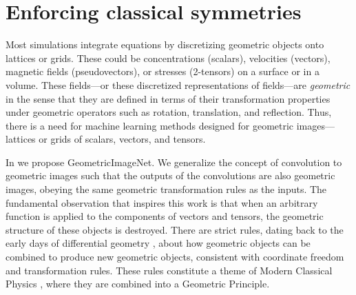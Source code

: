 \documentclass[10pt]{article}
\begin{document}
\section{Enforcing classical symmetries}

Most simulations integrate equations by discretizing geometric objects onto lattices or grids.
These could be concentrations (scalars), velocities (vectors), magnetic fields (pseudovectors), or stresses (2-tensors) on a surface or in a volume.
These fields---or these discretized representations of fields---are \emph{geometric} in the sense that they are defined in terms of their transformation properties under geometric operators such as rotation, translation, and reflection.
Thus, there is a need for machine learning methods designed for geometric images—lattices or grids of scalars, vectors, and tensors.

In \cite{gregory2023geometricimagenet} we propose GeometricImageNet. We generalize the concept of convolution to geometric images such that the outputs of the convolutions are also geometric images, obeying the same geometric transformation rules as the inputs.
The fundamental observation that inspires this work is that when an arbitrary function is applied to the components of vectors and tensors, the geometric structure of these objects is destroyed. There are strict rules, dating back to the early days
of differential geometry \cite{ricci}, about how geometric objects can be combined to produce new geometric objects, consistent with coordinate freedom and transformation rules. These rules constitute a theme of Modern Classical Physics \cite{mcp}, where they are combined into a Geometric Principle. 
\end{document}
